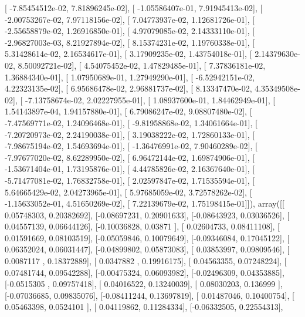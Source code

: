 \documentclass{article}
\begin{document}
       [ -7.85454512e-02,   7.81896245e-02],
       [ -1.05586407e-01,   7.91945413e-02],
       [ -2.00753267e-02,   7.97118156e-02],
       [  7.04773937e-02,   1.12681726e-01],
       [ -2.55658879e-02,   1.26916850e-01],
       [  4.97079085e-02,   2.14333110e-01],
       [ -2.96827003e-03,   8.21927894e-02],
       [  8.15374231e-02,   1.19760338e-01],
       [  5.31428614e-02,   2.16534617e-01],
       [  3.17909235e-02,   1.43754018e-01],
       [  2.14379630e-02,   8.50092721e-02],
       [  4.54075452e-02,   1.47829485e-01],
       [  7.37836181e-02,   1.36884340e-01],
       [  1.07950689e-01,   1.27949290e-01],
       [ -6.52942151e-02,   4.22323135e-02],
       [  6.95686478e-02,   2.96881737e-02],
       [  8.13347470e-02,   4.35349508e-02],
       [ -7.13758674e-02,   2.02227955e-01],
       [  1.08937600e-01,   1.84462949e-01],
       [  1.54143897e-04,   1.94157880e-01],
       [  6.79086247e-02,   9.08807480e-02],
       [ -7.47569771e-02,   1.24096468e-01],
       [ -9.81958868e-02,   1.34061664e-01],
       [ -7.20720973e-02,   2.24190038e-01],
       [  3.19038222e-02,   1.72860133e-01],
       [ -7.98675194e-02,   1.54693694e-01],
       [ -1.36476991e-02,   7.90460289e-02],
       [ -7.97677020e-02,   8.62289950e-02],
       [  6.96472144e-02,   1.69874906e-01],
       [ -1.53671404e-01,   1.73195876e-01],
       [  4.44785826e-02,   2.16367640e-01],
       [ -5.71477081e-02,   1.76832758e-01],
       [  2.02597847e-02,   1.71535594e-01],
       [  5.64665429e-02,   2.04273965e-01],
       [  5.97685059e-02,   3.72578262e-02],
       [ -1.15633052e-01,   4.51650269e-02],
       [  7.22139679e-02,   1.75198415e-01]]), array([[ 0.05748303,  0.20382692],
       [-0.08697231,  0.20901633],
       [-0.08643923,  0.03036526],
       [ 0.04557139,  0.06644126],
       [-0.10036828,  0.03871   ],
       [ 0.02604733,  0.08411108],
       [ 0.01591669,  0.08103519],
       [-0.05059846,  0.10079649],
       [-0.09346084,  0.17045122],
       [ 0.06352024,  0.06031447],
       [-0.04899802,  0.05873083],
       [ 0.03853997,  0.09809546],
       [ 0.0087117 ,  0.18372889],
       [ 0.0347882 ,  0.19916175],
       [ 0.04563355,  0.07248224],
       [ 0.07481744,  0.09542288],
       [-0.00475324,  0.06093982],
       [-0.02496309,  0.04353885],
       [-0.0515305 ,  0.09757418],
       [ 0.04016522,  0.13240039],
       [ 0.08030203,  0.136999  ],
       [-0.07036685,  0.09835076],
       [-0.08411244,  0.13697819],
       [ 0.01487046,  0.10400754],
       [ 0.05463398,  0.0524101 ],
       [ 0.04119862,  0.11284334],
       [-0.06332505,  0.22554313],
\end{document}
